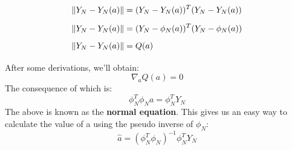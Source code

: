 \begin{equation}
    \begin{aligned}
        \norm{Y_N - Y_N(a)} &= (Y_N - Y_N(a))^{T}(Y_N-Y_N(a))\\[1.25ex]
        \norm{Y_N - Y_N(a)} &= (Y_N - \phi_N(a))^{T}(Y_N-\phi_N(a))\\[1.25ex]
        \norm{Y_N - Y_N(a)} &=Q(a)\\[1.25ex]
        
    \end{aligned}
\end{equation}
After some derivations, we'll obtain:
\begin{equation}
    \nabla_a Q(a) = 0
\end{equation}
The consequence of which is:
\begin{equation}
    \phi_N^{T}\phi_Na = \phi_N^{T}Y_N
\end{equation}
The above is known as the \textbf{normal equation}. This gives us an easy way to calculate the value of a using the pseudo inverse of $\phi_N$:
 \begin{equation}
     \hat{a} = (\phi_N^{T}\phi_N)^{-1}\phi^{T}_N Y_N
\end{equation}




















